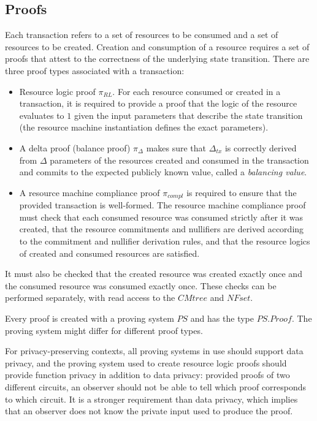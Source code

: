 \documentclass[
    11pt,            %
    techreport,        %
    affiltop,       %
]{art}
\begin{document}
\subsection{Proofs}

Each transaction refers to a set of resources to be consumed and a set of resources to be created. Creation and consumption of a resource requires a set of proofs that attest to the correctness of the underlying state transition. There are three proof types associated with a transaction:
\begin{itemize}
    \item Resource logic proof $\pi_{RL}$. For each resource consumed or created in a transaction, it is required to provide a proof that the logic of the resource evaluates to $1$ given the input parameters that describe the state transition (the resource machine instantiation defines the exact parameters).
    \item A delta proof (balance proof) $\pi_{\Delta}$ makes sure that $\Delta_{tx}$ is correctly derived from $\Delta$ parameters of the resources created and consumed in the transaction and commits to the expected publicly known value, called a \textit{balancing value}. 
    \item A resource machine compliance proof $\pi_{compl}$ is required to ensure that the provided transaction is well-formed. The resource machine compliance proof must check that each consumed resource was consumed strictly after it was created, that the resource commitments and nullifiers are derived according to the commitment and nullifier derivation rules, and that the resource logics of created and consumed resources are satisfied.
\end{itemize}

\begin{remark}\label{non-proof-checks}
    It must also be checked that the created resource was created exactly once and the consumed resource was consumed exactly once. These checks can be performed separately, with read access to the $CMtree$ and $NFset$.
\end{remark}

\begin{remark}\label{remark:proving-system-assumption}
Every proof is created with a proving system $PS$ and has the type $PS.Proof$. The proving system might differ for different proof types.
\end{remark}

\begin{remark}
    For privacy-preserving contexts, all proving systems in use should support data privacy, and the proving system used to create resource logic proofs should provide function privacy in addition to data privacy: provided proofs of two different circuits, an observer should not be able to tell which proof corresponds to which circuit. It is a stronger requirement than data privacy, which implies that an observer does not know the private input used to produce the proof.
\end{remark}
\end{document}
